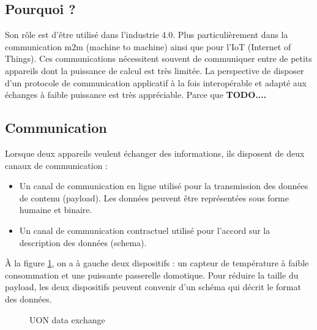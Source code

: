 \documentclass[
    iict, %
    il, %
]{heig-tb}
\begin{document}
\subsection{Pourquoi ?}
Son rôle est d'être utilisé dans l'industrie 4.0. Plus particulièrement dans la communication m2m (machine to machine) ainsi que pour l'IoT (Internet of Things).
Ces communications nécessitent souvent de communiquer entre de petits appareils dont la puissance de calcul est très limitée.
La perspective de disposer d'un protocole de communication applicatif à la fois interopérable et adapté aux échanges à faible puissance est très appréciable.
Parce que \textbf{TODO....}

\subsection{Communication}
Lorsque deux appareils veulent échanger des informations, ils disposent de deux canaux de communication :
\begin{itemize}
    \item Un canal de communication en ligne utilisé pour la transmission des données de contenu (payload). Les données peuvent être représentées sous forme humaine et binaire.
    \item Un canal de communication contractuel utilisé pour l'accord sur la description des données (schema).
\end{itemize}

\vspace{\parskip}

À la figure \ref*{data-exchange}, on a à gauche deux dispositifs : un capteur de température à faible consommation
et une puissante passerelle domotique. Pour réduire la taille du payload, les deux dispositifs peuvent convenir d'un schéma qui décrit le format des données.

\begin{figure}[!h]
    \begin{center}
    \end{center}
    \caption[UON data exchange]{\label{data-exchange}UON data exchange}
\end{figure}
\end{document}

